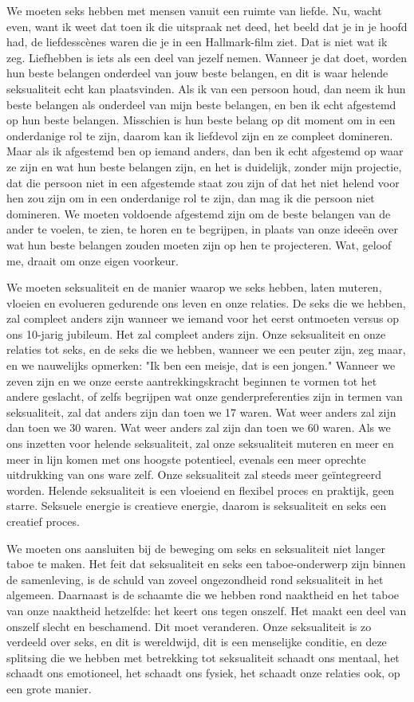 We moeten seks hebben met mensen vanuit een ruimte van liefde. Nu, wacht even, want ik weet dat toen ik die uitspraak net deed, het beeld dat je in je hoofd had, de liefdesscènes waren die je in een Hallmark-film ziet. Dat is niet wat ik zeg. Liefhebben is iets als een deel van jezelf nemen. Wanneer je dat doet, worden hun beste belangen onderdeel van jouw beste belangen, en dit is waar helende seksualiteit echt kan plaatsvinden. Als ik van een persoon houd, dan neem ik hun beste belangen als onderdeel van mijn beste belangen, en ben ik echt afgestemd op hun beste belangen. Misschien is hun beste belang op dit moment om in een onderdanige rol te zijn, daarom kan ik liefdevol zijn en ze compleet domineren. Maar als ik afgestemd ben op iemand anders, dan ben ik echt afgestemd op waar ze zijn en wat hun beste belangen zijn, en het is duidelijk, zonder mijn projectie, dat die persoon niet in een afgestemde staat zou zijn of dat het niet helend voor hen zou zijn om in een onderdanige rol te zijn, dan mag ik die persoon niet domineren. We moeten voldoende afgestemd zijn om de beste belangen van de ander te voelen, te zien, te horen en te begrijpen, in plaats van onze ideeën over wat hun beste belangen zouden moeten zijn op hen te projecteren. Wat, geloof me, draait om onze eigen voorkeur.

We moeten seksualiteit en de manier waarop we seks hebben, laten muteren, vloeien en evolueren gedurende ons leven en onze relaties. De seks die we hebben, zal compleet anders zijn wanneer we iemand voor het eerst ontmoeten versus op ons 10-jarig jubileum. Het zal compleet anders zijn. Onze seksualiteit en onze relaties tot seks, en de seks die we hebben, wanneer we een peuter zijn, zeg maar, en we nauwelijks opmerken: "Ik ben een meisje, dat is een jongen." Wanneer we zeven zijn en we onze eerste aantrekkingskracht beginnen te vormen tot het andere geslacht, of zelfs begrijpen wat onze genderpreferenties zijn in termen van seksualiteit, zal dat anders zijn dan toen we 17 waren. Wat weer anders zal zijn dan toen we 30 waren. Wat weer anders zal zijn dan toen we 60 waren. Als we ons inzetten voor helende seksualiteit, zal onze seksualiteit muteren en meer en meer in lijn komen met ons hoogste potentieel, evenals een meer oprechte uitdrukking van ons ware zelf. Onze seksualiteit zal steeds meer geïntegreerd worden. Helende seksualiteit is een vloeiend en flexibel proces en praktijk, geen starre. Seksuele energie is creatieve energie, daarom is seksualiteit en seks een creatief proces.

We moeten ons aansluiten bij de beweging om seks en seksualiteit niet langer taboe te maken. Het feit dat seksualiteit en seks een taboe-onderwerp zijn binnen de samenleving, is de schuld van zoveel ongezondheid rond seksualiteit in het algemeen. Daarnaast is de schaamte die we hebben rond naaktheid en het taboe van onze naaktheid hetzelfde: het keert ons tegen onszelf. Het maakt een deel van onszelf slecht en beschamend. Dit moet veranderen. Onze seksualiteit is zo verdeeld over seks, en dit is wereldwijd, dit is een menselijke conditie, en deze splitsing die we hebben met betrekking tot seksualiteit schaadt ons mentaal, het schaadt ons emotioneel, het schaadt ons fysiek, het schaadt onze relaties ook, op een grote manier.

